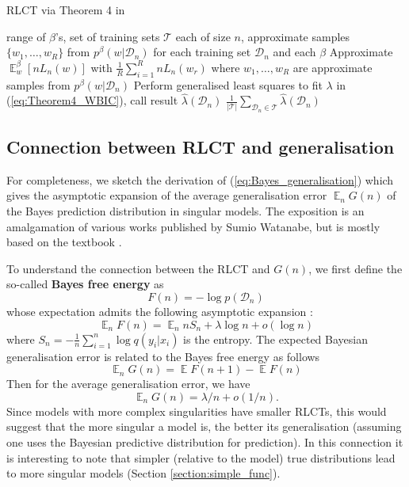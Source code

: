 \documentclass[11pt]{article}
\DeclareMathOperator*{\E}{\operatorname{\mathbb{E}}}
\numberwithin{equation}{section}
\theoremstyle{plain}
\theoremstyle{definition}
\begin{document}
\begin{algorithm}[tb]
	\caption{RLCT via Theorem 4  in \citet{watanabe_widely_2013}}
	\label{alg:thm4}
	\begin{algorithmic}
		 range of $\beta$'s, set of training sets $\mathcal T$ each of size $n$, approximate samples $\{w_1,\ldots,w_R\}$ from $p^\beta(w|\mathcal D_n)$ for each training set $\mathcal D_n$ and each $\beta$
		\STATE Approximate ${\E}_w^\beta [nL_n(w)]$ with $\frac{1}{R} \sum_{i=1}^R nL_n(w_r)$ where $w_1,\ldots,w_R$ are approximate samples from $p^\beta(w|\mathcal D_n)$
		\ENDFOR
		\STATE Perform generalised least squares to fit $\lambda$ in (\ref{eq:Theorem4_WBIC}), call result $\hat \lambda(\mathcal D_n)$
		\ENDFOR
		 $\frac{1}{|\mathcal T|} \sum_{\mathcal D_n \in \mathcal T} \hat \lambda(\mathcal D_n)$
	\end{algorithmic}
\end{algorithm}


\subsection{Connection between RLCT and generalisation} \label{appendix:generalisation_theory}
For completeness, we sketch the derivation of (\ref{eq:Bayes_generalisation}) which gives the asymptotic expansion of the average generalisation error ${\E}_n G(n)$ of the Bayes prediction distribution  in singular models. The exposition is an amalgamation of various works published by Sumio Watanabe, but is mostly based on the textbook \citep{watanabe_algebraic_2009}. 

To understand the connection between the RLCT and $G(n)$, we first define the so-called \textbf{Bayes free energy} as 
\[
F(n) = -\log p(\mathcal D_n)
\]
whose expectation admits the following asymptotic expansion \citep{watanabe_algebraic_2009}:
\[
{\E}_n F(n) =  {\E}_n n S_n + \lambda \log n + o(\log n)
\]
where $S_n = -\frac{1}{n} \sum_{i=1}^n \log q(y_i|x_i)$ is the entropy. 
The expected Bayesian generalisation error is related to the Bayes free energy as follows
\[
{\E}_n G(n) = \E F(n+1) - \E F(n)
\]
Then for the average generalisation error, we have
\begin{equation}
	{\E}_n G(n) = \lambda/n + o(1/n).
	\label{eq:bayesgenerr}
\end{equation}
Since models with more complex singularities have smaller RLCTs, this would suggest that the more singular a model is, the better its generalisation (assuming one uses the Bayesian predictive distribution for prediction). In this connection it is interesting to note that simpler (relative to the model) true distributions lead to more singular models (Section \ref{section:simple_func}).
\end{document}
